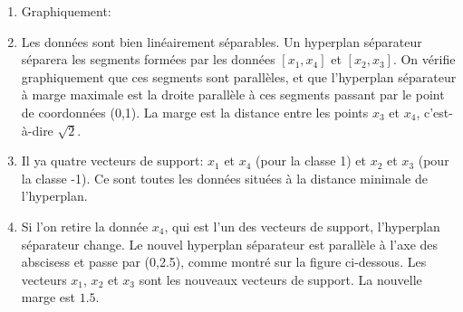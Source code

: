 \documentclass{article}
\begin{document}
\begin{enumerate}
\begin{enumerate}
		\item Graphiquement:
		\bigbreak
	
	\item Les données sont bien linéairement séparables. Un hyperplan séparateur séparera les segments formées par les données $[x_1,x_4]$ et $[x_2,x_3]$. On vérifie graphiquement que ces segments sont parallèles, et que l'hyperplan séparateur à marge maximale est la droite parallèle à ces segments passant par le point de coordonnées (0,1). La marge est la distance entre les points $x_3$ et $x_4$, c'est-à-dire $\sqrt{2}$. 
	
	\item Il ya quatre vecteurs de support: $x_1$ et $x_4$ (pour la classe 1) et $x_2$ et $x_3$ (pour la classe -1). Ce sont toutes les données situées à la distance minimale de l'hyperplan.
	\bigbreak
	\begin{center}
	\end{center}
	
	\item Si l'on retire la donnée $x_4$, qui est l'un des vecteurs de support, l'hyperplan séparateur change. Le nouvel hyperplan séparateur est parallèle à l'axe des abscisess et passe par (0,2.5), comme montré sur la figure ci-dessous. Les vecteurs $x_1$, $x_2$ et $x_3$ sont les nouveaux vecteurs de support. La nouvelle marge est $1.5$.
	

\end{enumerate}
\end{enumerate}
\end{document}
